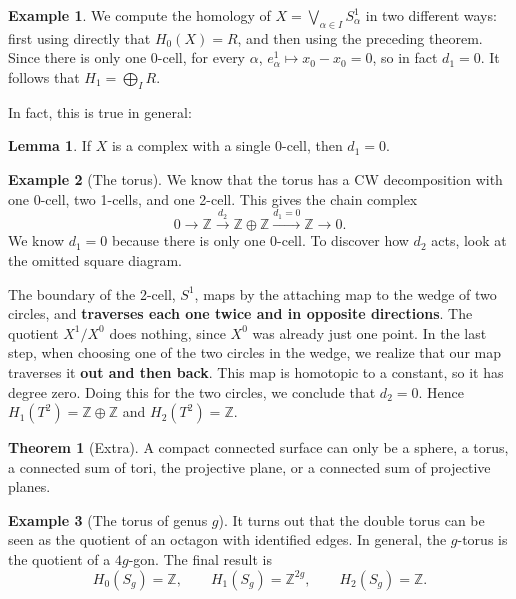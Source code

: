 \documentclass{book}
\theoremstyle{definition}
\newtheorem*{lema}{Lemma}
\newtheorem*{teo}{Theorem}
\newtheorem*{ejem}{Example}
\newcommand{\Z}{\mathbb{Z}}
\begin{document}
\begin{ejem}
We compute the homology of
$X=\bigvee_{\alpha\in I}S^1_\alpha$ in two different ways:
first using directly that $H_0(X)=R$, and then using the
preceding theorem. Since there is only one 0-cell, for every
$\alpha$, $e^1_\alpha\mapsto x_0-x_0=0$, so in fact
$d_1=0$. It follows that $H_1=\bigoplus_IR$.
\end{ejem}

In fact, this is true in general:

\begin{lema}
If $X$ is a complex with a single 0-cell, then $d_1=0$.
\end{lema}

\begin{ejem}[The torus]\label{ejem:toroCW}
We know that the torus has a CW decomposition with one
0-cell, two 1-cells, and one 2-cell. This gives the chain
complex
$$
0\to\Z\xrightarrow{d_2}\Z\oplus\Z\xrightarrow{d_1=0}\Z\to0.
$$
We know $d_1=0$ because there is only one 0-cell. To discover
how $d_2$ acts, look at the omitted square diagram.

The boundary of the 2-cell, $S^1$, maps by the attaching map
to the wedge of two circles, and \textbf{traverses each one
twice and in opposite directions}. The quotient $X^1/X^0$
does nothing, since $X^0$ was already just one point. In the
last step, when choosing one of the two circles in the wedge,
we realize that our map traverses it \textbf{out and then
back}. This map is homotopic to a constant, so it has degree
zero. Doing this for the two circles, we conclude that
$d_2=0$. Hence $H_1(T^2)=\Z\oplus\Z$ and $H_2(T^2)=\Z$.
\end{ejem}

\begin{teo}[Extra]
A compact connected surface can only be a sphere, a torus, a
connected sum of tori, the projective plane, or a connected
sum of projective planes.
\end{teo}

\begin{ejem}[The torus of genus $g$]
It turns out that the double torus can be seen as the
quotient of an octagon with identified edges. In general, the
$g$-torus is the quotient of a $4g$-gon. The final result is
$$
H_0(S_g)=\Z,
\qquad
H_1(S_g)=\Z^{2g},
\qquad
H_2(S_g)=\Z.
$$
\end{ejem}
\end{document}
